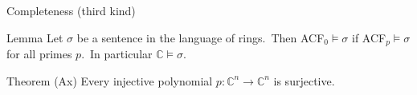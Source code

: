 \documentclass{beamer}
\begin{document}
\begin{frame}{Completeness (third kind)}
	\begin{block}{Lemma}
		Let $\sigma$ be a sentence in the language of rings.\pause\ Then \textsf{ACF}$_0\models\sigma$ if \textsf{ACF}$_p\models\sigma$ for all primes $p$.\pause\ In particular $\mathbb{C}\models\sigma$.
	\end{block}
	
	\pause	
	
	\begin{block}{Theorem (Ax)}
		Every injective polynomial $p:\mathbb{C}^n\to\mathbb{C}^n$ is surjective.
	\end{block}
\end{frame}
\end{document}
